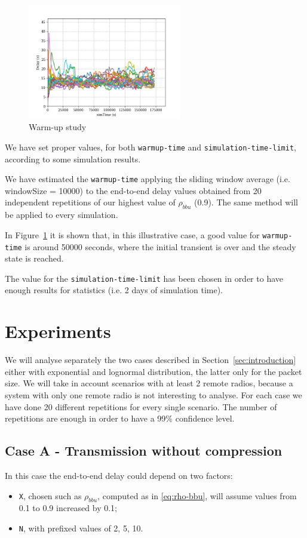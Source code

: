 \documentclass[11pt,a4paper,oneside, openright]{article}
\begin{document}
\begin{figure}[H]
  \centering
  \includegraphics[width=0.6\textwidth]{images/warm-up}
  \caption{Warm-up study}
  \label{fig:warm-up-study}
\end{figure}

We have set proper values, for both \texttt{warmup-time} and \texttt{simulation-time-limit}, according to some simulation results.

We have estimated the \texttt{warmup-time} applying the sliding window average (i.e. windowSize = 10000) to the end-to-end delay values obtained from 20 independent repetitions of our highest value of $ \rho_{bbu} $ (0.9). The same method will be applied to every simulation.

In Figure~\ref{fig:warm-up-study} it is shown that, in this illustrative case, a good value for \texttt{warmup-time} is around 50000 seconds, where the initial transient is over and the steady state is reached. 

The value for the \texttt{simulation-time-limit} has been chosen in order to have enough results for statistics (i.e. 2 days of simulation time).

\section{Experiments}
We will analyse separately the two cases described in Section~\ref{sec:introduction} either with exponential and lognormal distribution, the latter only for the packet size.
We will take in account scenarios with at least 2 remote radios, because a system with only one remote radio is not interesting to analyse. For each case we have done 20 different repetitions for every single scenario.
The number of repetitions are enough in order to have a 99\% confidence level. 

\subsection{Case A - Transmission without compression}
In this case the end-to-end delay could depend on two factors:
\begin{itemize}
	\item \texttt{X}, chosen such as $ \rho_{bbu} $, computed as in \eqref{eq:rho-bbu}, will assume values from 0.1 to 0.9 increased by 0.1;
	\item \texttt{N}, with prefixed values of 2, 5, 10.
\end{itemize}
\end{document}
